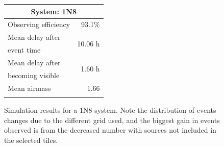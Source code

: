 \begin{colsection}
\begin{colsection}
\begin{figure}[p]
\begin{center}
\begin{minipage}[t]{0.35\textwidth}
\begin{tabular}{lr}
\multicolumn{2}{c}{\textbf{System: 1N8}} \\
\midrule
Observing efficiency & 93.1\% \\
\midrule
Mean delay after     & \multirow{2}{*}{10.06 h} \\
event time           & \\
Mean delay after     & \multirow{2}{*}{1.60 h} \\
becoming visible     & \\
\midrule
Mean airmass         & 1.66 \\
& \\
\end{tabular}
\vfill
\end{minipage}

\end{center}
\caption[Simulation results: 1N8 system]{Simulation results for a 1N8 system. Note the distribution of events changes due to the different grid used, and the biggest gain in events observed is from the decreased number with sources not included in the selected tiles.
}
\label{fig:sim_1n8}
\end{figure}


\begin{figure}[p]
\begin{center}


\end{center}
\end{figure}
\end{colsection}
\end{colsection}
